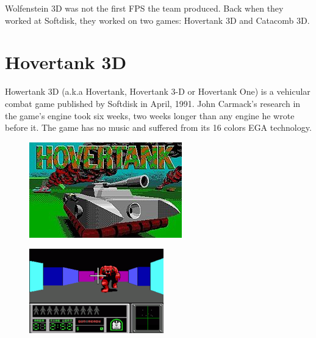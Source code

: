 Wolfenstein 3D was not the first FPS the team produced. Back when they worked at Softdisk, they worked on two games: Hovertank 3D and Catacomb 3D.\\
\par
\section{Hovertank 3D}
Howertank 3D (a.k.a Hovertank, Hovertank 3-D or Hovertank One)  is a vehicular combat game published by Softdisk in April, 1991. John Carmack's research in the game's engine took six weeks, two weeks longer than any engine he wrote before it. The game has no music and suffered from its 16 colors EGA technology.
\begin{figure}[H]
\centering
\includegraphics[width=\textwidth]{screenshots/Hovertank_3D_title_screen.png}
\end{figure}

\begin{figure}[H]
\centering
\includegraphics[width=\textwidth]{screenshots/Hovertank_3D_screen.png}
\end{figure}



